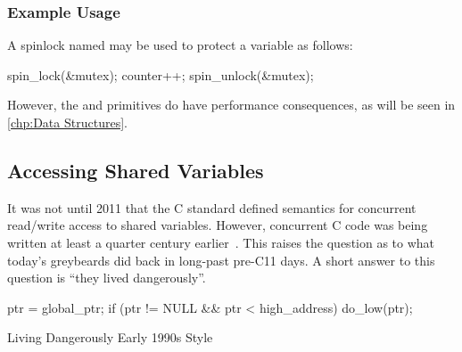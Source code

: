 \subsubsection{Example Usage}

A spinlock named  may be used to protect a variable
 as follows:

\begin{VerbatimU}
spin_lock(&mutex);
counter++;
spin_unlock(&mutex);
\end{VerbatimU}

\QuickQuizEnd

However, the  and  primitives
do have performance consequences, as will be seen in
\cref{chp:Data Structures}.

\subsection{Accessing Shared Variables}
\label{sec:toolsoftrade:Accessing Shared Variables}

It was not until 2011 that the C standard defined semantics for concurrent
read/write access to shared variables.
However, concurrent C code was being written at least a quarter century
earlier~\cite{Beck85,Inman85}.
This raises the question as to what today's greybeards did back
in long-past pre-C11 days.
A short answer to this question is ``they lived dangerously''.

\begin{listing}
\begin{fcvlabel}
\begin{VerbatimL}[commandchars=\\\{\}]
ptr = global_ptr;
if (ptr != NULL && ptr < high_address)
	do_low(ptr);
\end{VerbatimL}
\end{fcvlabel}
\caption{Living Dangerously Early 1990s Style}
\label{lst:toolsoftrade:Living Dangerously Early 1990s Style}
\end{listing}

